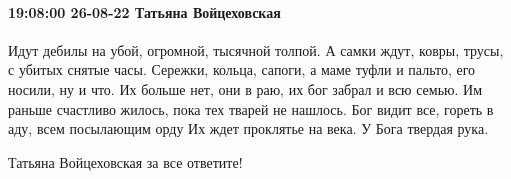  
 
 
 
 

\paragraph{19:08:00 26-08-22 Татьяна Войцеховская}

Идут дебилы на убой, огромной, тысячной
толпой.
А самки ждут, ковры, трусы, с
убитых снятые часы.
Сережки, кольца, сапоги, а маме
туфли и пальто, его носили,
ну и что. Их больше нет, они в раю,
их бог забрал и всю семью.
Им раньше счастливо жилось, пока
тех тварей не нашлось.
Бог видит все, гореть в аду, всем
посылающим орду
Их ждет проклятье на века. У Бога твердая
рука.

Татьяна Войцеховская
за все ответите!
